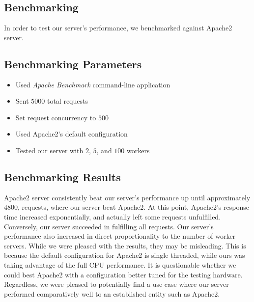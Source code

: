 \documentclass[10pt]{article}
\begin{document}
\pagebreak
\begin{multicols}{2}
\section*{Benchmarking}
\par
In order to test our server's performance, we benchmarked against Apache2 server.
\subsection*{Benchmarking Parameters}
\begin{itemize}
\item
Used \textit{Apache Benchmark} command-line application
\item
Sent $5000$ total requests
\item
Set request concurrency to $500$
\item
Used Apache2's default configuration
\item
Tested our server with $2$, $5$, and $100$ workers
\end{itemize}
\subsection*{Benchmarking Results}
\par
Apache2 server consistently beat our server's performance up until approximately $4800$, requests, where our server beat Apache2.  At this point, Apache2's response time increased exponentially, and actually left some requests unfulfilled.  Conversely, our server succeeded in fulfilling all requests. Our server's performance also increased in direct proportionality to the number of worker servers. While we were pleased with the results, they may be misleading. This is because the default configuration for Apache2 is single threaded, while ours was taking advantage of the full CPU performance.  It is questionable whether we could best Apache2 with a configuration better tuned for the testing hardware. Regardless, we were pleased to potentially find a use case where our server performed comparatively well to an established entity such as Apache2.
\end{multicols}
\end{document}
